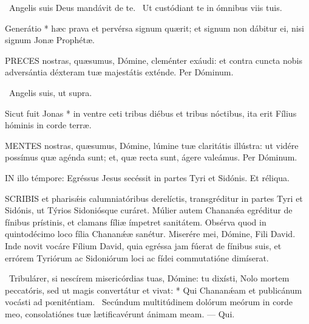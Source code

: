 \V\ Angelis suis Deus mandávit de te. \R\ Ut custódiant te in ómnibus viis tuis.

 Generátio * hæc prava et pervérsa signum quærit; et signum non dábitur ei, nisi signum Jonæ Prophétæ.


\lettrine[lines=2]{P}{RECES} nostras, quæsumus, Dómine, cleménter exáudi: et contra cuncta nobis adversántia déxteram tuæ majestátis exténde. Per Dóminum.

\V\ Angelis suis, ut supra.

 Sicut fuit Jonas * in ventre ceti tribus diébus et tribus nóctibus, ita erit Fílius hóminis in corde terræ.


\lettrine[lines=2]{M}{ENTES} nostras, quæsumus, Dómine, lúmine tuæ claritátis illústra: ut vidére possímus quæ agénda sunt; et, quæ recta sunt, ágere valeámus. Per Dóminum.

\sectionornament




\lettrine[lines=2]{I}{N} illo témpore: Egréssus Jesus secéssit in partes Tyri et Sidónis. Et réliqua.



\lettrine[lines=2]{S}{CRIBIS} et pharisǽis calumniatóribus derelíctis, transgréditur in partes Tyri et Sidónis, ut Týrios Sidoniósque curáret. Múlier autem Chananǽa egréditur de fínibus prístinis, et clamans fíliæ ímpetret sanitátem. Obsérva quod in quintodécimo loco fília Chananǽæ sanétur. Miserére mei, Dómine, Fili David. Inde novit vocáre Fílium David, quia egréssa jam fúerat de fínibus suis, et errórem Tyriórum ac Sidoniórum loci ac fídei commutatióne dimíserat.

\R\ Tribulárer, si nescírem misericórdias tuas, Dómine: tu dixísti, Nolo mortem peccatóris, sed ut magis convertátur et vivat: * Qui Chananǽam et publicánum vocásti ad pœniténtiam. \V\ Secúndum multitúdinem dolórum meórum in corde meo, consolatiónes tuæ lætificavérunt ánimam meam. --- Qui.



